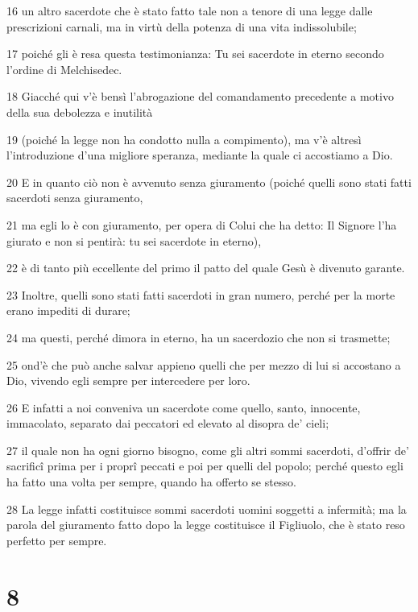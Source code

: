 \par 16 un altro sacerdote che è stato fatto tale non a tenore di una legge dalle prescrizioni carnali, ma in virtù della potenza di una vita indissolubile;
\par 17 poiché gli è resa questa testimonianza: Tu sei sacerdote in eterno secondo l'ordine di Melchisedec.
\par 18 Giacché qui v'è bensì l'abrogazione del comandamento precedente a motivo della sua debolezza e inutilità
\par 19 (poiché la legge non ha condotto nulla a compimento), ma v'è altresì l'introduzione d'una migliore speranza, mediante la quale ci accostiamo a Dio.
\par 20 E in quanto ciò non è avvenuto senza giuramento (poiché quelli sono stati fatti sacerdoti senza giuramento,
\par 21 ma egli lo è con giuramento, per opera di Colui che ha detto: Il Signore l'ha giurato e non si pentirà: tu sei sacerdote in eterno),
\par 22 è di tanto più eccellente del primo il patto del quale Gesù è divenuto garante.
\par 23 Inoltre, quelli sono stati fatti sacerdoti in gran numero, perché per la morte erano impediti di durare;
\par 24 ma questi, perché dimora in eterno, ha un sacerdozio che non si trasmette;
\par 25 ond'è che può anche salvar appieno quelli che per mezzo di lui si accostano a Dio, vivendo egli sempre per intercedere per loro.
\par 26 E infatti a noi conveniva un sacerdote come quello, santo, innocente, immacolato, separato dai peccatori ed elevato al disopra de' cieli;
\par 27 il quale non ha ogni giorno bisogno, come gli altri sommi sacerdoti, d'offrir de' sacrificî prima per i proprî peccati e poi per quelli del popolo; perché questo egli ha fatto una volta per sempre, quando ha offerto se stesso.
\par 28 La legge infatti costituisce sommi sacerdoti uomini soggetti a infermità; ma la parola del giuramento fatto dopo la legge costituisce il Figliuolo, che è stato reso perfetto per sempre.

\chapter{8}

